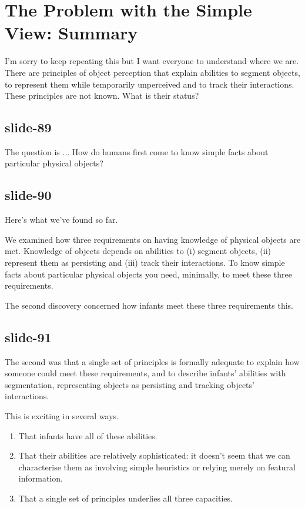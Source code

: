 \documentclass[12pt,\papersize]{extarticle}
\begin{document}
\section{The Problem with the Simple View: Summary}

I'm sorry to keep repeating this but I want everyone to understand where we
are. There are principles of object perception that explain abilities to
segment objects, to represent them while temporarily unperceived and to
track their interactions. These principles are not known. What is their
status?

\subsection{slide-89}
The question is ...
How do humans first come to know simple facts about particular physical objects?

\subsection{slide-90}
Here’s what we’ve found so far.

We examined how three requirements on having knowledge of physical objects are met.
Knowledge of objects depends on abilities to (i) segment objects, (ii) represent them as
persisting and (iii) track their interactions.
To know simple facts about particular physical objects you need, minimally,
to meet these three requirements.

The second discovery concerned how infants meet these three requirements this.

\subsection{slide-91}
The second was that a single set of principles is formally adequate to
explain how someone could meet these requirements, and to describe
infants' abilities with segmentation, representing objects as persisting
and tracking objects' interactions.

This is exciting in several ways.
\begin{enumerate}
\item That infants have all of these abilities.
\item That their abilities are relatively sophisticated: it doesn’t seem
that we can characterise them as involving simple heuristics or relying
merely on featural information.
\item That a single set of principles underlies all three capacities.
\end{enumerate}
\end{document}
